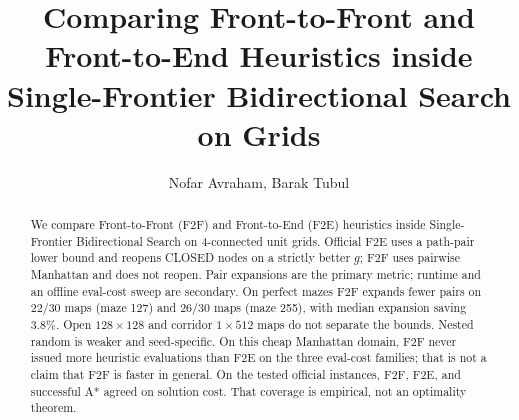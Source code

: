 \documentclass[letterpaper]{article} %
\title{Comparing Front-to-Front and Front-to-End Heuristics inside Single-Frontier Bidirectional Search on Grids}
\author{
    Nofar Avraham,
    Barak Tubul
}
\begin{document}
\maketitle

\begin{abstract}
We compare Front-to-Front (F2F) and Front-to-End (F2E) heuristics inside Single-Frontier Bidirectional Search on 4-connected unit grids. Official F2E uses a path-pair lower bound and reopens CLOSED nodes on a strictly better \(g\); F2F uses pairwise Manhattan and does not reopen. Pair expansions are the primary metric; runtime and an offline eval-cost sweep are secondary. On perfect mazes F2F expands fewer pairs on \(22/30\) maps (maze 127) and \(26/30\) maps (maze 255), with median expansion saving \(3.8\%\). Open \(128\times128\) and corridor \(1\times512\) maps do not separate the bounds. Nested random is weaker and seed-specific. On this cheap Manhattan domain, F2F never issued more heuristic evaluations than F2E on the three eval-cost families; that is not a claim that F2F is faster in general. On the tested official instances, F2F, F2E, and successful A* agreed on solution cost. That coverage is empirical, not an optimality theorem.
\end{abstract}

\begin{links}
\end{links}








\appendix

\end{document}
